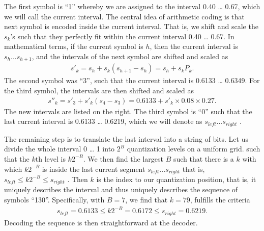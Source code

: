 \documentclass[letterpaper,10pt,english]{jupyterBook}
\begin{document}
\sphinxAtStartPar
The first symbol is “1” whereby we are assigned to the interval 0.40 …
0.67, which we will call the current interval. The central idea of
arithmetic coding is that next symbol is encoded inside the current
interval. That is, we shift and scale the \(s_{k}\)’s such that
they perfectly fit within the current interval 0.40 … 0.67. In
mathematical terms, if the current symbol is \(h\), then the current
interval is \(s_{h} ... s_{h+1}\), and the intervals of
the next symbol are shifted and scaled as
\begin{equation*}
\begin{split} s'_k = s_h + s_k(s_{h+1}-s_h) = s_h + s_kP_k. \end{split}
\end{equation*}
\sphinxAtStartPar
The second symbol was “3”, such that the current interval is 0.6133 …
0.6349. For the third symbol, the intervals are then shifted and scaled
as
\begin{equation*}
\begin{split} s''_k = s'_3 + s'_k(s_4-s_3) = 0.6133 + s'_k\times 0.08\times
0.27. \end{split}
\end{equation*}
\sphinxAtStartPar
The new intervals are listed on the right. The third symbol is “0” such
that the last current interval is 0.6133 … 0.6219, which we will
denote as \( s_{left} ... s_{right} \) .

\sphinxAtStartPar
The remaining step is to translate the last interval into a string of
bits. Let us divide the whole interval 0 … 1 into \(2^{B}\)
quantization levels on a uniform grid. such that the \(k\)th level is \(
k 2^{-B}. \) We then find the largest \(B\) such that there is a \(k\) with
which \(k2^{-B}\) is inside the last current segment \( s_{left}
... s_{right} \) that is, \( s_{left} \leq k2^{-B} \leq s_{right}
\) . Then \(k\) is the index to our quantization position, that is, it
uniquely describes the interval and thus uniquely describes the sequence
of symbols “130”. Specifically, with \(B=7\), we find that \(k=79\),
fulfills the criteria
\begin{equation*}
\begin{split} s_{left}=0.6133 \leq k2^{-B} = 0.6172 \leq s_{right} = 0.6219.
\end{split}
\end{equation*}
\sphinxAtStartPar
Decoding the sequence is then straightforward at the decoder.
\end{document}
